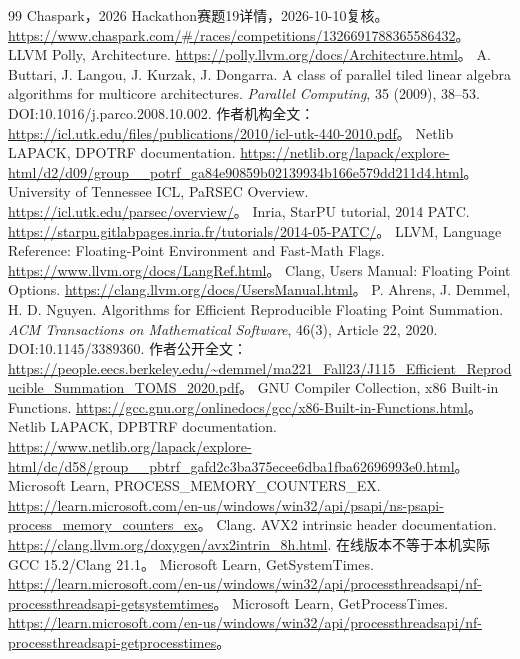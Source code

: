 \documentclass[UTF8,a4paper,11pt]{ctexart}
\begin{document}
\begin{thebibliography}{99}
 Chaspark，2026 Hackathon赛题19详情，2026-10-10复核。\url{https://www.chaspark.com/#/races/competitions/1326691788365586432}。
 LLVM Polly, Architecture. \url{https://polly.llvm.org/docs/Architecture.html}。
 A. Buttari, J. Langou, J. Kurzak, J. Dongarra. A class of parallel tiled linear algebra algorithms for multicore architectures. \emph{Parallel Computing}, 35 (2009), 38--53. DOI:10.1016/j.parco.2008.10.002. 作者机构全文：\url{https://icl.utk.edu/files/publications/2010/icl-utk-440-2010.pdf}。
 Netlib LAPACK, DPOTRF documentation. \url{https://netlib.org/lapack/explore-html/d2/d09/group__potrf_ga84e90859b02139934b166e579dd211d4.html}。
 University of Tennessee ICL, PaRSEC Overview. \url{https://icl.utk.edu/parsec/overview/}。
 Inria, StarPU tutorial, 2014 PATC. \url{https://starpu.gitlabpages.inria.fr/tutorials/2014-05-PATC/}。
 LLVM, Language Reference: Floating-Point Environment and Fast-Math Flags. \url{https://www.llvm.org/docs/LangRef.html}。
 Clang, Users Manual: Floating Point Options. \url{https://clang.llvm.org/docs/UsersManual.html}。
 P. Ahrens, J. Demmel, H. D. Nguyen. Algorithms for Efficient Reproducible Floating Point Summation. \emph{ACM Transactions on Mathematical Software}, 46(3), Article 22, 2020. DOI:10.1145/3389360. 作者公开全文：\url{https://people.eecs.berkeley.edu/~demmel/ma221_Fall23/J115_Efficient_Reproducible_Summation_TOMS_2020.pdf}。
 GNU Compiler Collection, x86 Built-in Functions. \url{https://gcc.gnu.org/onlinedocs/gcc/x86-Built-in-Functions.html}。
 Netlib LAPACK, DPBTRF documentation. \url{https://www.netlib.org/lapack/explore-html/dc/d58/group__pbtrf_gafd2c3ba375ecee6dba1fba62696993e0.html}。
 Microsoft Learn, PROCESS\_MEMORY\_COUNTERS\_EX. \url{https://learn.microsoft.com/en-us/windows/win32/api/psapi/ns-psapi-process_memory_counters_ex}。
 Clang. AVX2 intrinsic header documentation. \url{https://clang.llvm.org/doxygen/avx2intrin_8h.html}. 在线版本不等于本机实际GCC 15.2/Clang 21.1。
 Microsoft Learn, GetSystemTimes. \url{https://learn.microsoft.com/en-us/windows/win32/api/processthreadsapi/nf-processthreadsapi-getsystemtimes}。
 Microsoft Learn, GetProcessTimes. \url{https://learn.microsoft.com/en-us/windows/win32/api/processthreadsapi/nf-processthreadsapi-getprocesstimes}。
\end{thebibliography}
\end{document}
